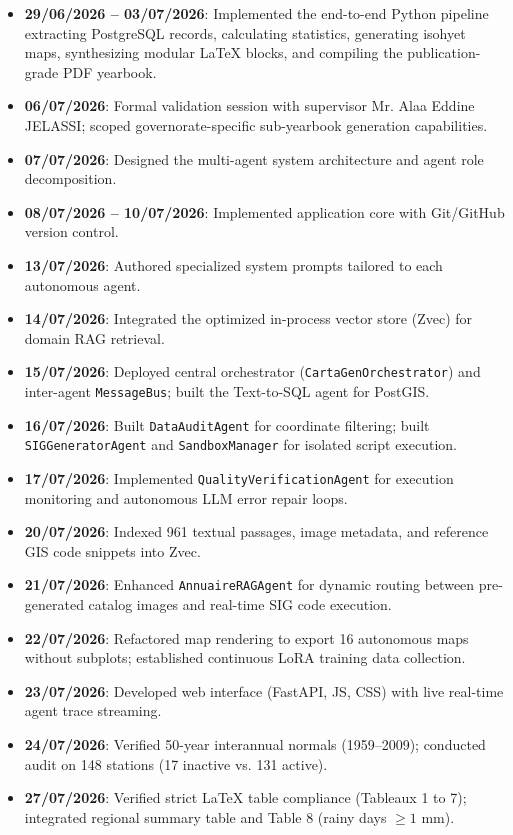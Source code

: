 \documentclass[12pt,a4paper]{report}
\begin{document}
\begin{itemize}[leftmargin=*]
  \item \textbf{29/06/2026 -- 03/07/2026}: Implemented the end-to-end Python pipeline extracting PostgreSQL records, calculating statistics, generating isohyet maps, synthesizing modular LaTeX blocks, and compiling the publication-grade PDF yearbook.
  \item \textbf{06/07/2026}: Formal validation session with supervisor Mr. Alaa Eddine JELASSI; scoped governorate-specific sub-yearbook generation capabilities.
  \item \textbf{07/07/2026}: Designed the multi-agent system architecture and agent role decomposition.
  \item \textbf{08/07/2026 -- 10/07/2026}: Implemented application core with Git/GitHub version control.
  \item \textbf{13/07/2026}: Authored specialized system prompts tailored to each autonomous agent.
  \item \textbf{14/07/2026}: Integrated the optimized in-process vector store (Zvec) for domain RAG retrieval.
  \item \textbf{15/07/2026}: Deployed central orchestrator (\texttt{CartaGenOrchestrator}) and inter-agent \texttt{MessageBus}; built the Text-to-SQL agent for PostGIS.
  \item \textbf{16/07/2026}: Built \texttt{DataAuditAgent} for coordinate filtering; built \texttt{SIGGeneratorAgent} and \texttt{SandboxManager} for isolated script execution.
  \item \textbf{17/07/2026}: Implemented \texttt{QualityVerificationAgent} for execution monitoring and autonomous LLM error repair loops.
  \item \textbf{20/07/2026}: Indexed 961 textual passages, image metadata, and reference GIS code snippets into Zvec.
  \item \textbf{21/07/2026}: Enhanced \texttt{AnnuaireRAGAgent} for dynamic routing between pre-generated catalog images and real-time SIG code execution.
  \item \textbf{22/07/2026}: Refactored map rendering to export 16 autonomous maps without subplots; established continuous LoRA training data collection.
  \item \textbf{23/07/2026}: Developed web interface (FastAPI, JS, CSS) with live real-time agent trace streaming.
  \item \textbf{24/07/2026}: Verified 50-year interannual normals (1959--2009); conducted audit on 148 stations (17 inactive vs. 131 active).
  \item \textbf{27/07/2026}: Verified strict LaTeX table compliance (Tableaux 1 to 7); integrated regional summary table and Table 8 (rainy days $\geq 1\text{ mm}$).

\end{itemize}
\end{document}
